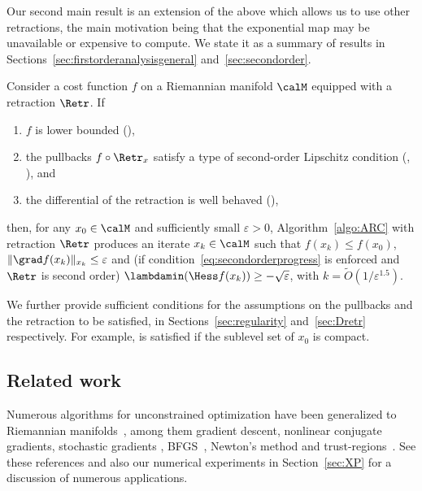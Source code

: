 Our second main result is an extension of the above which allows us to use other retractions, the main motivation being that the exponential map may be unavailable or expensive to compute. We state it as a summary of results in Sections~\ref{sec:firstorderanalysisgeneral} and~\ref{sec:secondorder}.
\begin{theorem} \label{thm:informalRETR}
	Consider a cost function $f$ on a Riemannian manifold $\calM$ equipped with a retraction $\Retr$. If
	\begin{enumerate}
		\item[a)] $f$ is lower bounded (),
		\item[b)] the pullbacks $f \circ \Retr_x$ satisfy a type of second-order Lipschitz condition (, ), and
		\item[c)] the differential of the retraction is well behaved (),
	\end{enumerate}
	then, for any $x_0\in\calM$ and sufficiently small $\varepsilon > 0$, Algorithm~\ref{algo:ARC} with retraction $\Retr$ produces an iterate $x_k \in \calM$ such that $f(x_k) \leq f(x_0)$, $\|\grad f(x_k)\|_{x_k} \leq \varepsilon$ and (if condition~\eqref{eq:secondorderprogress} is enforced and $\Retr$ is second order) $\lambdamin(\Hess f(x_k)) \geq -\sqrt{\varepsilon}$, with $k = \tilde O(1/\varepsilon^{1.5})$. %
\end{theorem}
We further provide sufficient conditions for the assumptions on the pullbacks and the retraction to be satisfied, in Sections~\ref{sec:regularity} and~\ref{sec:Dretr} respectively. For example,  is satisfied if the sublevel set of $x_0$ is compact.


\subsection*{Related work}


Numerous algorithms for unconstrained optimization have been generalized to Riemannian manifolds~\citep{luenberger1972gradient,Gabay1982,smith1994optimization,edelman1998geometry,AMS08}, among them gradient descent, nonlinear conjugate gradients, stochastic gradients \citep{bonnabel2013stochastic,zhang2016riemannian}, BFGS~\citep{ring2012optimization}, Newton's method \citep{adler2002spine} and trust-regions~\citep{genrtr}. See these references and also our numerical experiments in Section~\ref{sec:XP} for a discussion of numerous applications.

